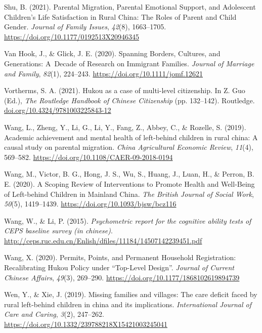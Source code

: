 \documentclass[
  man,floatsintext]{apa7}
\newlength{\cslhangindent}
\newlength{\cslentryspacingunit} %
\newenvironment{CSLReferences}[2] %
 {%
  \setlength{\parindent}{0pt}
  \ifodd #1
  \let\oldpar\par
  \def\par{\hangindent=\cslhangindent\oldpar}
  \fi
  \setlength{\parskip}{#2\cslentryspacingunit}
 }%
 {}
\begin{document}
\begin{CSLReferences}{1}{0}
\leavevmode{}%
Shu, B. (2021). Parental Migration, Parental Emotional Support, and Adolescent Children{'}s Life Satisfaction in Rural China: The Roles of Parent and Child Gender. \emph{Journal of Family Issues}, \emph{42}(8), 1663--1705. \url{https://doi.org/10.1177/0192513X20946345}

\leavevmode{}%
Van Hook, J., \& Glick, J. E. (2020). Spanning Borders, Cultures, and Generations: A~Decade of Research on Immigrant Families. \emph{Journal of Marriage and Family}, \emph{82}(1), 224--243. \url{https://doi.org/10.1111/jomf.12621}

\leavevmode{}%
Vortherms, S. A. (2021). Hukou as a case of multi-level citizenship. In Z. Guo (Ed.), \emph{The Routledge Handbook of Chinese Citizenship} (pp. 132--142). Routledge. \href{https://doi.org/10.4324/9781003225843-12}{doi.org/10.4324/9781003225843-12}

\leavevmode{}%
Wang, L., Zheng, Y., Li, G., Li, Y., Fang, Z., Abbey, C., \& Rozelle, S. (2019). Academic achievement and mental health of left-behind children in rural china: A causal study on parental migration. \emph{China Agricultural Economic Review}, \emph{11}(4), 569--582. \url{https://doi.org/10.1108/CAER-09-2018-0194}

\leavevmode{}%
Wang, M., Victor, B. G., Hong, J. S., Wu, S., Huang, J., Luan, H., \& Perron, B. E. (2020). A Scoping Review of Interventions to Promote Health and Well-Being of Left-behind Children in Mainland China. \emph{The British Journal of Social Work}, \emph{50}(5), 1419--1439. \url{https://doi.org/10.1093/bjsw/bcz116}

\leavevmode{}%
Wang, W., \& Li, P. (2015). \emph{Psychometric report for the cognitive ability tests of CEPS baseline survey (in chinese)}. \url{http://ceps.ruc.edu.cn/Enlish/dfiles/11184/14507142239451.pdf}

\leavevmode{}%
Wang, X. (2020). Permits, Points, and Permanent Household Registration: Recalibrating Hukou Policy under {``}Top-Level Design{''}. \emph{Journal of Current Chinese Affairs}, \emph{49}(3), 269--290. \url{https://doi.org/10.1177/1868102619894739}

\leavevmode{}%
Wen, Y., \& Xie, J. (2019). Missing families and villages: The care deficit faced by rural left-behind children in china and its implications. \emph{International Journal of Care and Caring}, \emph{3}(2), 247--262. \url{https://doi.org/10.1332/239788218X15421003245041}


\end{CSLReferences}
\end{document}
